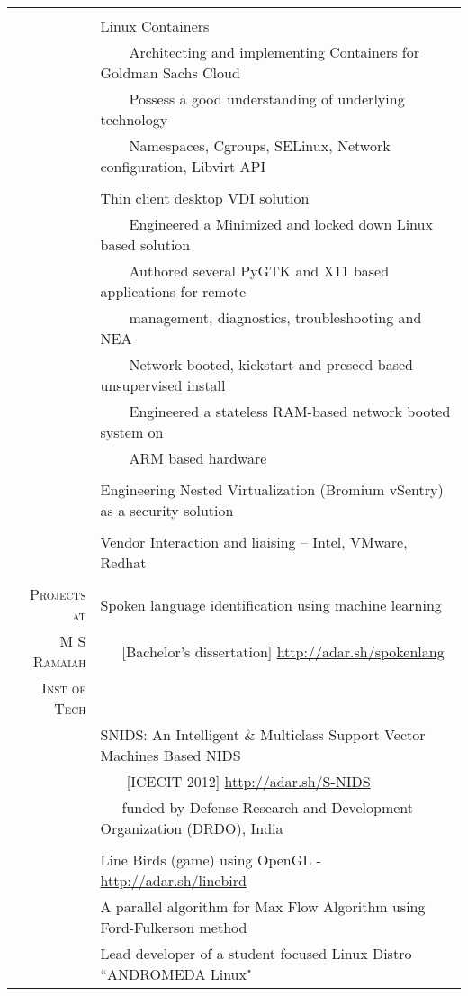 \documentclass[a4paper,10pt]{article} %
\newcommand{\tabitem}{~~\llap{\textbullet}~~}
\begin{document}
\begin{tabular}{rp{12cm}}
&\\
& Linux Containers\\
& \tabitem Architecting and implementing Containers for Goldman Sachs Cloud \\
& \tabitem Possess a good understanding of underlying technology \\
& ~~~~Namespaces, Cgroups, SELinux, Network configuration, Libvirt API \\
&\\
& Thin client desktop VDI solution\\
& \tabitem Engineered a Minimized and locked down Linux based solution \\
& \tabitem Authored several PyGTK and X11 based applications for remote \\
& ~~~~management, diagnostics, troubleshooting and NEA \\
& \tabitem Network booted, kickstart and preseed based unsupervised install \\
& \tabitem Engineered a stateless RAM-based network booted system on\\ & ~~~~ARM based hardware\\
&\\
& Engineering Nested Virtualization (Bromium vSentry) as a security solution\\
& \\
& Vendor Interaction and liaising – Intel, VMware, Redhat \\
&\\
\textsc{Projects at} & Spoken language identification using machine learning \\ 
\textsc{M S Ramaiah} & ~~~[Bachelor's dissertation] \qquad \href{http://adar.sh/spokenlang}{http://adar.sh/spokenlang} \\
\textsc{Inst of Tech} & \\
& SNIDS: An Intelligent \& Multiclass Support Vector Machines Based NIDS \\ 
& ~~~ [ICECIT 2012] \qquad \href{http://adar.sh/S-NIDS}{http://adar.sh/S-NIDS} \\
& ~~~funded by Defense Research and Development Organization (DRDO), India \\
& \\
& Line Birds (game) using OpenGL - \href{http://adar.sh/linebird}{http://adar.sh/linebird}\\
& A parallel algorithm for Max Flow Algorithm using Ford-Fulkerson method \\
& Lead developer of a student focused Linux Distro ``ANDROMEDA Linux" \\
\end{tabular}
\end{document}
